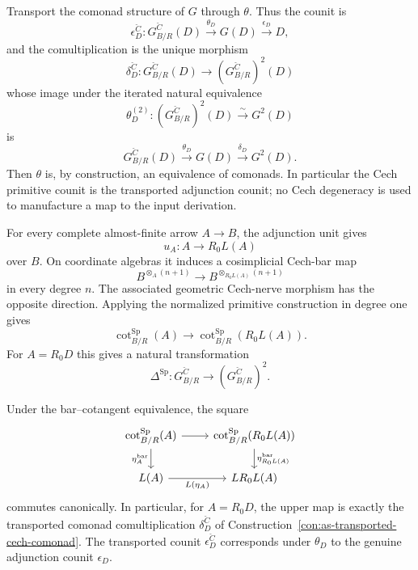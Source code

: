 \begin{construction}
\label{con:as-transported-cech-comonad}
Transport the comonad structure of $G$ through $\theta$.  Thus the counit is
\[
\boxed{
    \epsilon_D^{\check C}:
    G^{\check C}_{B/R}(D)
    \xrightarrow{\theta_D}
    G(D)
    \xrightarrow{\epsilon_D}
    D,
}
\]
and the comultiplication is the unique morphism
\[
\boxed{
    \delta_D^{\check C}:
    G^{\check C}_{B/R}(D)
    \longrightarrow
    \left(G^{\check C}_{B/R}\right)^2(D)
}
\]
whose image under the iterated natural equivalence
\[
    \theta_D^{(2)}:
    \left(G^{\check C}_{B/R}\right)^2(D)
    \xrightarrow{\sim}
    G^2(D)
\]
is
\[
    G^{\check C}_{B/R}(D)
    \xrightarrow{\theta_D}
    G(D)
    \xrightarrow{\delta_D}
    G^2(D).
\]
Then $\theta$ is, by construction, an equivalence of comonads.  In
particular the Cech primitive counit is the transported adjunction counit; no
Cech degeneracy is used to manufacture a map to the input derivation.
\end{construction}

\begin{construction}
\label{con:as-cech-unit-cooperation}
For every complete almost-finite arrow $A\to B$, the adjunction unit gives
\[
    u_A:A\longrightarrow R_0L(A)
\]
over $B$.  On coordinate algebras it induces a cosimplicial Cech-bar map
\[
    B^{\otimes_A(n+1)}
    \longrightarrow
    B^{\otimes_{R_0L(A)}(n+1)}
\]
in every degree $n$.  The associated geometric Cech-nerve morphism has the
opposite direction.  Applying the normalized primitive construction in degree
one gives
\[
    \operatorname{cot}^{\mathrm{Sp}}_{B/R}(A)
    \longrightarrow
    \operatorname{cot}^{\mathrm{Sp}}_{B/R}(R_0L(A)).
\]
For $A=R_0D$ this gives a natural transformation
\[
\boxed{
    \Delta^{\mathrm{Sp}}:
    G^{\check C}_{B/R}
    \longrightarrow
    \left(G^{\check C}_{B/R}\right)^2.
}
\]
\end{construction}

\begin{lemma}
\label{lem:as-cech-unit-mate}
Under the bar--cotangent equivalence, the square
\[
\begin{tikzcd}
\operatorname{cot}^{\mathrm{Sp}}_{B/R}(A)
  \arrow[r]
  \arrow[d,"\eta_A^{\mathrm{bar}}"'] &
\operatorname{cot}^{\mathrm{Sp}}_{B/R}(R_0L(A))
  \arrow[d,"\eta_{R_0L(A)}^{\mathrm{bar}}"]\\
L(A)
  \arrow[r,"L(\eta_A)"'] &
LR_0L(A)
\end{tikzcd}
\]
commutes canonically.  In particular, for $A=R_0D$, the upper map is exactly
the transported comonad comultiplication $\delta_D^{\check C}$ of
Construction~\ref{con:as-transported-cech-comonad}.  The transported counit
$\epsilon_D^{\check C}$ corresponds under $\theta_D$ to the genuine
adjunction counit $\epsilon_D$.
\end{lemma}

